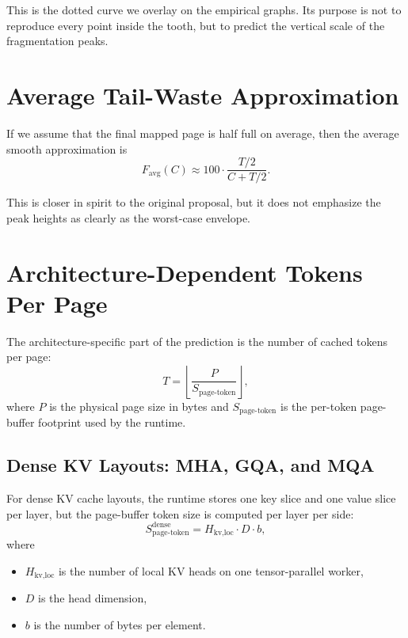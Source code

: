 \documentclass[11pt]{article}
\begin{document}
This is the dotted curve we overlay on the empirical graphs.
Its purpose is not to reproduce every point inside the tooth, but to predict the vertical scale of the fragmentation peaks.

\section{Average Tail-Waste Approximation}

If we assume that the final mapped page is half full on average, then the average smooth approximation is
\begin{equation}
F_{\text{avg}}(C)
\approx 100 \cdot \frac{T/2}{C + T/2}.
\end{equation}

This is closer in spirit to the original proposal, but it does not emphasize the peak heights as clearly as the worst-case envelope.

\section{Architecture-Dependent Tokens Per Page}

The architecture-specific part of the prediction is the number of cached tokens per page:
\begin{equation}
T = \left\lfloor \frac{P}{S_{\text{page-token}}} \right\rfloor,
\end{equation}
where $P$ is the physical page size in bytes and $S_{\text{page-token}}$ is the per-token page-buffer footprint used by the runtime.

\subsection{Dense KV Layouts: MHA, GQA, and MQA}

For dense KV cache layouts, the runtime stores one key slice and one value slice per layer, but the page-buffer token size is computed per layer per side:
\begin{equation}
S_{\text{page-token}}^{\text{dense}}
= H_{\text{kv,loc}} \cdot D \cdot b,
\end{equation}
where
\begin{itemize}
    \item $H_{\text{kv,loc}}$ is the number of local KV heads on one tensor-parallel worker,
    \item $D$ is the head dimension,
    \item $b$ is the number of bytes per element.
\end{itemize}
\end{document}
